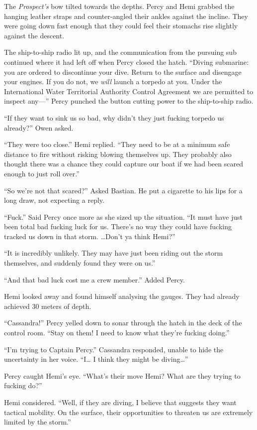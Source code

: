 \documentclass[]{scrbook}
\begin{document}
The \emph{Prospect's} bow tilted towards the depths. Percy and Hemi
grabbed the hanging leather straps and counter-angled their ankles
against the incline. They were going down fast enough that they could
feel their stomachs rise slightly against the descent.

The ship-to-ship radio lit up, and the communication from the pursuing
sub continued where it had left off when Percy closed the hatch.
``Diving submarine: you are ordered to discontinue your dive. Return to
the surface and disengage your engines. If you do not, we \emph{will}
launch a torpedo at you. Under the International Water Territorial
Authority Control Agreement we are permitted to inspect any---'' Percy
punched the button cutting power to the ship-to-ship radio.

``If they want to sink us so bad, why didn't they just fucking torpedo
us already?'' Owen asked.

``They were too close.'' Hemi replied. ``They need to be at a minimum
safe distance to fire without risking blowing themselves up. They
probably also thought there was a chance they could capture our boat if
we had been scared enough to just roll over.''

``So we're not that scared?'' Asked Bastian. He put a cigarette to his
lips for a long draw, not expecting a reply.

``Fuck.'' Said Percy once more as she sized up the situation. ``It must
have just been total bad fucking luck for us. There's no way they could
have fucking tracked us down in that storm. \ldots{}Don't ya think
Hemi?''

``It is incredibly unlikely. They may have just been riding out the
storm themselves, and suddenly found they were on us.''

``And that bad luck cost me a crew member.'' Added Percy.

Hemi looked away and found himself analysing the gauges. They had
already achieved 30 meters of depth.

``Cassandra!'' Percy yelled down to sonar through the hatch in the deck
of the control room. ``Stay on them! I need to know what they're fucking
doing.''

``I'm trying to Captain Percy.'' Cassandra responded, unable to hide the
uncertainty in her voice. ``I\ldots{} I think they might be
diving\ldots{}''

Percy caught Hemi's eye. ``What's their move Hemi? What are they trying
to fucking do?''

Hemi considered. ``Well, if they are diving, I believe that suggests
they want tactical mobility. On the surface, their opportunities to
threaten us are extremely limited by the storm.''
\end{document}

